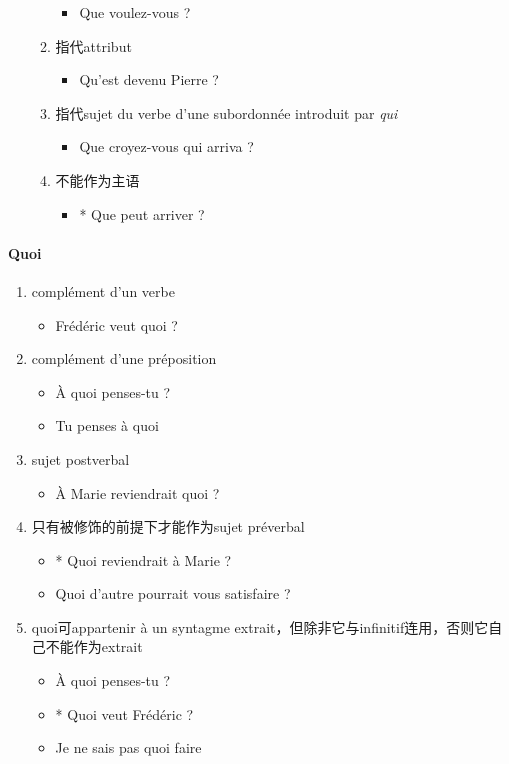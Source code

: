 \documentclass[UTF8]{report}
\begin{document}
\begin{enumerate}
\begin{enumerate}
        \begin{itemize}
            \item Que voulez-vous ?
        \end{itemize}
        \item 指代attribut
        \begin{itemize}
            \item Qu’est devenu Pierre ?
        \end{itemize}
        \item 指代sujet du verbe d’une subordonnée introduit par \textit{qui}
        \begin{itemize}
            \item Que croyez-vous qui arriva ?
        \end{itemize}
        \item 不能作为主语
        \begin{itemize}
            \item * Que peut arriver ?
        \end{itemize}
    \end{enumerate}
\end{enumerate}

\paragraph{Quoi}
\begin{enumerate}
    \item complément d’un verbe
    \begin{itemize}
        \item Frédéric veut quoi ?
    \end{itemize}
    \item complément d’une préposition
    \begin{itemize}
        \item À quoi penses-tu ?
        \item Tu penses à quoi
    \end{itemize}
    \item sujet postverbal
    \begin{itemize}
        \item À Marie reviendrait quoi ?
    \end{itemize}
    \item 只有被修饰的前提下才能作为sujet préverbal
    \begin{itemize}
        \item * Quoi reviendrait à Marie ?
        \item Quoi d’autre pourrait vous satisfaire ?
    \end{itemize}
    \item quoi可appartenir à un syntagme extrait，但除非它与infinitif连用，否则它自己不能作为extrait
    \begin{itemize}
        \item À quoi penses-tu ?
        \item * Quoi veut Frédéric ?
        \item Je ne sais pas quoi faire
    \end{itemize}
\end{enumerate}
\end{document}

